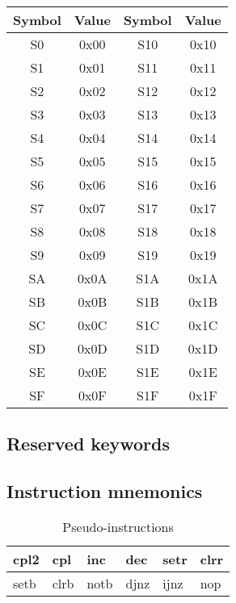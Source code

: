         \begin{table}[h!]
            \centering
            \begin{tabular}{|cc|cc|}
                \hline
                Symbol & Value & Symbol & Value \\\hline
                S0     & 0x00  & S10    & 0x10  \\\hline
                S1     & 0x01  & S11    & 0x11  \\\hline
                S2     & 0x02  & S12    & 0x12  \\\hline
                S3     & 0x03  & S13    & 0x13  \\\hline
                S4     & 0x04  & S14    & 0x14  \\\hline
                S5     & 0x05  & S15    & 0x15  \\\hline
                S6     & 0x06  & S16    & 0x16  \\\hline
                S7     & 0x07  & S17    & 0x17  \\\hline
                S8     & 0x08  & S18    & 0x18  \\\hline
                S9     & 0x09  & S19    & 0x19  \\\hline
                SA     & 0x0A  & S1A    & 0x1A  \\\hline
                SB     & 0x0B  & S1B    & 0x1B  \\\hline
                SC     & 0x0C  & S1C    & 0x1C  \\\hline
                SD     & 0x0D  & S1D    & 0x1D  \\\hline
                SE     & 0x0E  & S1E    & 0x1E  \\\hline
                SF     & 0x0F  & S1F    & 0x1F  \\\hline
            \end{tabular}
        \end{table}

    \subsection{Reserved keywords}
        \subsection{Instruction mnemonics}
            \begin{table}[h!]
                \centering
                \begin{tabular}{|l|l|l|l|l|l|}
                    \hline
                    cpl2 & cpl  & inc  & dec  & setr & clrr \\\hline
                    setb & clrb & notb & djnz & ijnz & nop  \\\hline
                \end{tabular}
                \caption{Pseudo-instructions}
            \end{table}

